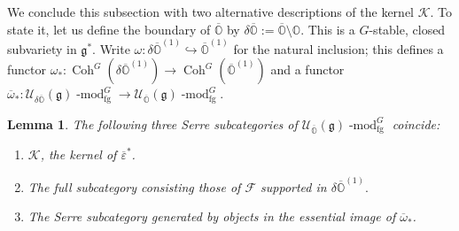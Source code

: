 \documentclass[twoside,12pt,reqno]{amsart}
\newtheorem{Lemma}[Theorem]{Lemma}
\theoremstyle{remark}
\numberwithin{equation}{section}
\def\lmod{\!\operatorname{-mod}}
\def\Coh{\operatorname{Coh}}
\def\o{\overline}
\def\O{{\mathbb O}}
\def\cO{{\overline{\mathbb O}}}
\def\g{{\mathfrak g}}
\def\cF{\mathcal{F}}
\def\cK{\mathcal{K}}
\def\U{\mathcal{U}}
\newcommand{\fg}{\operatorname{fg}}
\begin{document}
We conclude this subsection with two alternative descriptions of the kernel $\cK$. To state it, let us define the boundary of $\cO$ by $\delta\cO:=\cO\setminus \O$. This is a $G$-stable, closed subvariety in $\g^*$. Write $\omega:\delta \cO^{(1)} \hookrightarrow \cO^{(1)}$ for the natural inclusion; this defines a functor $\omega_*:\Coh^G(\delta\cO^{(1)})\to \Coh^G(\cO^{(1)})$ and a functor $\o\omega_*:\U_{\delta\cO}(\g)\lmod^G_{\fg}\to \U_{\cO}(\g)\lmod^G_{\fg}$.

\begin{Lemma}
\label{L:tiptop}
    The following three Serre subcategories of $\U_\cO(\g)\lmod^G_{\fg}$ coincide:
    \begin{enumerate}
        \item $\cK$, the kernel of $\o\varepsilon^*$.
        \item The full subcategory consisting those of $\cF$ supported in $\delta\cO^{(1)}.$
        \item The Serre subcategory generated by objects in the essential image of $\o\omega_*$. 
    \end{enumerate}
\end{Lemma} 
\end{document}
